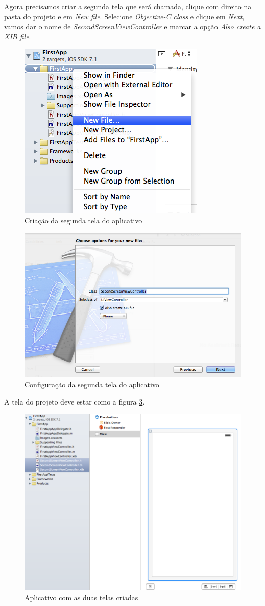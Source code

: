 \documentclass[a4paper,12pt,brazil,doubleside]{book}
\begin{document}
\begin{singlespace}
Agora precisamos criar a segunda tela que será chamada, clique com direito na pasta do projeto e em \emph{New file}. Selecione \emph{Objective-C class} e clique em \emph{Next}, vamos dar o nome de \emph{SecondScreenViewController} e marcar a opção \emph{Also create a XIB file}.

\begin{figure}[H]
  \centering
  \includegraphics[width=.35\textwidth]{figuras/3/tela_novo_projeto_32.png}
  \caption{Criação da segunda tela do aplicativo}
  \label{fig:a}
\end{figure}

\begin{figure}[H]
  \centering
  \includegraphics[width=.75\textwidth]{figuras/3/tela_novo_projeto_33.png}
  \caption{Configuração da segunda tela do aplicativo}
  \label{fig:a}
\end{figure}


A tela do projeto deve estar como a figura \ref{fig:app_com_duas_telas}.

\begin{figure}[H]
  \centering
  \includegraphics[width=.75\textwidth]{figuras/3/tela_novo_projeto_34.png}
  \caption{Aplicativo com as duas telas criadas}
  \label{fig:app_com_duas_telas}
\end{figure}



\end{singlespace}
\end{document}
